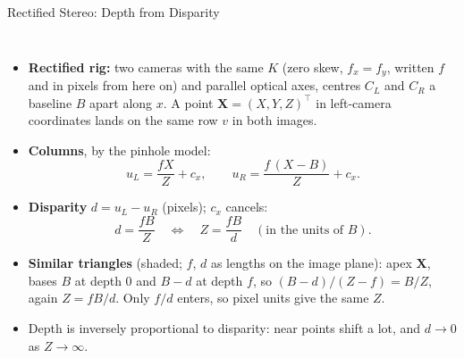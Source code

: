 \begin{frame}{Rectified Stereo: Depth from Disparity}
  \begin{columns}[T,onlytextwidth]
      \begin{itemize}\footnotesize\itemsep0.3em
        \item \textbf{Rectified rig:} two cameras with the same $K$ (zero skew, $f_x=f_y$, written $f$ and in pixels from here on) and parallel optical axes, centres $C_L$ and $C_R$ a baseline $B$ apart along $x$. A point $\mathbf{X}=(X,Y,Z)^\top$ in left-camera coordinates lands on the same row $v$ in both images.
        \item \textbf{Columns}, by the pinhole model:
        \[ u_L = \frac{fX}{Z}+c_x, \qquad u_R = \frac{f\,(X-B)}{Z}+c_x . \]
        \item \textbf{Disparity} $d = u_L - u_R$ (pixels); $c_x$ cancels:
        \[ d = \frac{fB}{Z} \quad\Longleftrightarrow\quad Z = \frac{fB}{d} \quad (\text{in the units of } B). \]
        \item \textbf{Similar triangles} (shaded; $f$, $d$ as lengths on the image plane): apex $\mathbf{X}$, bases $B$ at depth $0$ and $B-d$ at depth $f$, so $(B-d)/(Z-f) = B/Z$, again $Z = fB/d$. Only $f/d$ enters, so pixel units give the same $Z$.
        \item Depth is inversely proportional to disparity: near points shift a lot, and $d \to 0$ as $Z \to \infty$.
      \end{itemize}
      \centering
\end{columns}
\end{frame}
